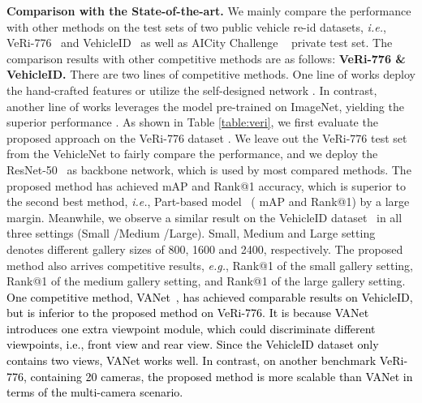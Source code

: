 \documentclass[journal]{IEEEtran}
\def\eg{\emph{e.g.}}
\def\ie{\emph{i.e.}}
\newcommand{\zznote}[1]{\textcolor{black}{#1}}
\begin{document}
\noindent \textbf{Comparison with the State-of-the-art.} We mainly compare the performance with other methods on the test sets of two public vehicle re-id datasets, \ie, VeRi-776~\cite{liu2016deep} and VehicleID~\cite{liu2016pku} as well as AICity Challenge ~\cite{tang2019pamtri} private test set.  The comparison results with other competitive methods are as follows: \textbf{VeRi-776 \& VehicleID.} There are two lines of competitive methods. One line of works deploy the hand-crafted features \cite{liao2015person,liu2016deep} or utilize the self-designed network \cite{zhou2018aware,wang2017orientation,liu2017provid}. In contrast, another line of works leverages the model pre-trained on ImageNet, yielding the superior performance \cite{khorramshahi2019dual,chu2019vehicle,tang2019pamtri,he2019part}. As shown in Table \ref{table:veri}, we first evaluate the proposed approach on the VeRi-776 dataset \cite{liu2016deep}. We leave out the VeRi-776 test set from the VehicleNet to fairly compare the performance, and we deploy the ResNet-50~\cite{he2016deep} as backbone network, which is used by most compared methods. The proposed method has achieved  mAP and  Rank@1 accuracy, which is superior to the second best method, \ie, Part-based model~\cite{he2019part} ( mAP and  Rank@1) by a large margin. Meanwhile, we observe a similar result on the VehicleID dataset~\cite{liu2016pku} in all three settings (Small /Medium /Large). Small, Medium and Large setting denotes different gallery sizes of 800, 1600 and 2400, respectively. The proposed method also arrives competitive results, \eg,  Rank@1 of the small gallery setting,  Rank@1 of the medium gallery setting, and  Rank@1 of the large gallery setting. \zznote{One competitive method, VANet~\cite{chu2019vehicle}, has achieved comparable results on VehicleID, but is inferior to the proposed method on VeRi-776. It is because VANet introduces one extra viewpoint module, which could discriminate different viewpoints, i.e., front view and rear view. Since the VehicleID dataset only contains two views, VANet works well. In contrast, on another benchmark VeRi-776, containing 20 cameras, the proposed method is more scalable than VANet in terms of the multi-camera scenario.} 
\end{document}
